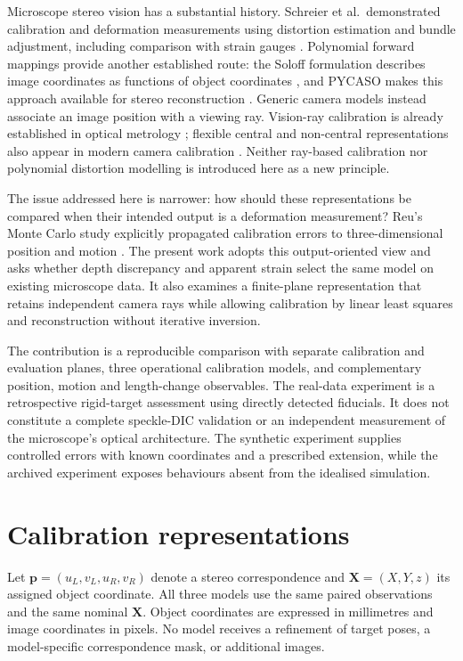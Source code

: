\documentclass[10pt,a4paper]{article}
\begin{document}
Microscope stereo vision has a substantial history. Schreier et al.\ demonstrated calibration and deformation measurements using distortion estimation and bundle adjustment, including comparison with strain gauges \cite{schreier2004}. Polynomial forward mappings provide another established route: the Soloff formulation describes image coordinates as functions of object coordinates \cite{soloff1997}, and PYCASO makes this approach available for stereo reconstruction \cite{pycaso2023}. Generic camera models instead associate an image position with a viewing ray. Vision-ray calibration is already established in optical metrology \cite{bothe2010}; flexible central and non-central representations also appear in modern camera calibration \cite{schops2020}. Neither ray-based calibration nor polynomial distortion modelling is introduced here as a new principle.

The issue addressed here is narrower: how should these representations be compared when their intended output is a deformation measurement? Reu's Monte Carlo study explicitly propagated calibration errors to three-dimensional position and motion \cite{reu2013}. The present work adopts this output-oriented view and asks whether depth discrepancy and apparent strain select the same model on existing microscope data. It also examines a finite-plane representation that retains independent camera rays while allowing calibration by linear least squares and reconstruction without iterative inversion.

The contribution is a reproducible comparison with separate calibration and evaluation planes, three operational calibration models, and complementary position, motion and length-change observables. The real-data experiment is a retrospective rigid-target assessment using directly detected fiducials. It does not constitute a complete speckle-DIC validation or an independent measurement of the microscope's optical architecture. The synthetic experiment supplies controlled errors with known coordinates and a prescribed extension, while the archived experiment exposes behaviours absent from the idealised simulation.

\section{Calibration representations}
Let $\mathbf p=(u_L,v_L,u_R,v_R)$ denote a stereo correspondence and $\mathbf X=(X,Y,z)$ its assigned object coordinate. All three models use the same paired observations and the same nominal $\mathbf X$. Object coordinates are expressed in millimetres and image coordinates in pixels. No model receives a refinement of target poses, a model-specific correspondence mask, or additional images.
\end{document}
